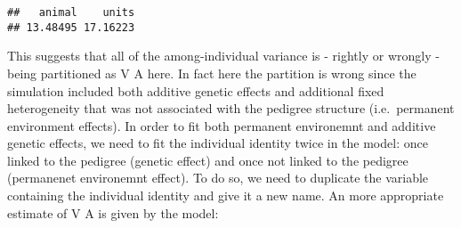 \documentclass[12pt,]{book}
\newenvironment{Shaded}{\begin{snugshade}}{\end{snugshade}}
\newcommand{\DataTypeTok}[1]{\textcolor[rgb]{0.13,0.29,0.53}{#1}}
\newcommand{\DecValTok}[1]{\textcolor[rgb]{0.00,0.00,0.81}{#1}}
\newcommand{\FloatTok}[1]{\textcolor[rgb]{0.00,0.00,0.81}{#1}}
\newcommand{\KeywordTok}[1]{\textcolor[rgb]{0.13,0.29,0.53}{\textbf{#1}}}
\newcommand{\NormalTok}[1]{#1}
\newcommand{\OperatorTok}[1]{\textcolor[rgb]{0.81,0.36,0.00}{\textbf{#1}}}
\newcommand{\OtherTok}[1]{\textcolor[rgb]{0.56,0.35,0.01}{#1}}
\newcommand{\StringTok}[1]{\textcolor[rgb]{0.31,0.60,0.02}{#1}}
\begin{document}
\begin{Shaded}
\end{Shaded}

\begin{verbatim}
##   animal    units 
## 13.48495 17.16223
\end{verbatim}

This suggests that all of the among-individual variance is - rightly or wrongly - being partitioned as V A here. In fact here the partition is wrong since the simulation included both additive genetic effects and additional fixed heterogeneity that was not associated with the pedigree structure (i.e.~permanent environment effects).
In order to fit both permanent environemnt and additive genetic effects, we need to fit the individual identity twice in the model: once linked to the pedigree (genetic effect) and once not linked to the pedigree (permanenet environemnt effect).
To do so, we need to duplicate the variable containing the individual identity and give it a new name.
An more appropriate estimate of V A is given by the model:
\end{document}
